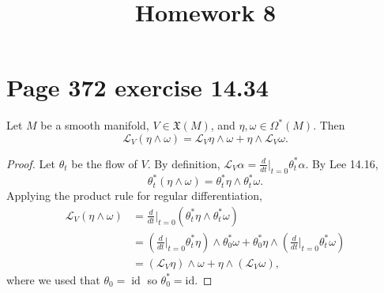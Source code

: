 \documentclass[10pt, letterpaper]{article}
\title{Homework 8}
\begin{document}
\makeproblem

\section{Page 372 exercise 14.34}
\begin{problem}\label{1}
	Let $M$ be a smooth manifold, $V\in \mathfrak{X} (M)$, and $\eta ,\omega \in \Omega ^*(M)$. Then
	\[
		\mathcal{L} _V(\eta \wedge \omega )=\mathcal{L} _V\eta \wedge \omega +\eta \wedge \mathcal{L} _V\omega 
	.\]
\end{problem}
\begin{proof}
    Let $\theta_t$ be the flow of $V$. By definition, $\mathcal{L}_V \alpha = \frac{d}{dt}\big|_{t=0} \theta_t^* \alpha$. By Lee 14.16,
    \[
    	\theta _t^*(\eta \wedge \omega )=\theta _t^*\eta \wedge \theta _t^*\omega 
    .\]
    Applying the product rule for regular differentiation,
    \begin{align*}
        \mathcal{L}_V (\eta \wedge \omega) &= \frac{d}{dt}\bigg|_{t=0} (\theta_t^* \eta \wedge \theta_t^* \omega) \\
        &= \left( \frac{d}{dt}\bigg|_{t=0} \theta_t^* \eta \right) \wedge \theta_0^* \omega + \theta_0^* \eta \wedge \left( \frac{d}{dt}\bigg|_{t=0} \theta_t^* \omega \right) \\
        &= (\mathcal{L}_V \eta) \wedge \omega + \eta \wedge (\mathcal{L}_V \omega)
    ,\end{align*}
    where we used that $\theta_0 = \operatorname{id}$ so $\theta_0^* =\mathrm{id} $.
\end{proof}
\end{document}
